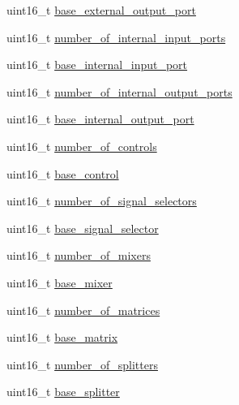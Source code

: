 \begin{DoxyCompactItemize}
uint16\+\_\+t \hyperlink{structjdksavdecc__descriptor__sensor__unit_a3103a3898813f4104c1d1d7f984e8229}{base\+\_\+external\+\_\+output\+\_\+port}
\item 
uint16\+\_\+t \hyperlink{structjdksavdecc__descriptor__sensor__unit_af14e1056175671f086901f07420bf46f}{number\+\_\+of\+\_\+internal\+\_\+input\+\_\+ports}
\item 
uint16\+\_\+t \hyperlink{structjdksavdecc__descriptor__sensor__unit_a11d926248b31db1ff60e6416c9c3d996}{base\+\_\+internal\+\_\+input\+\_\+port}
\item 
uint16\+\_\+t \hyperlink{structjdksavdecc__descriptor__sensor__unit_aeba303ee329974d2a1c3ff9b5b41ed4b}{number\+\_\+of\+\_\+internal\+\_\+output\+\_\+ports}
\item 
uint16\+\_\+t \hyperlink{structjdksavdecc__descriptor__sensor__unit_a238f1b0f1c8556b5e9586d93541169a5}{base\+\_\+internal\+\_\+output\+\_\+port}
\item 
uint16\+\_\+t \hyperlink{structjdksavdecc__descriptor__sensor__unit_a0104bea638bdadf1a547c2b93813e22f}{number\+\_\+of\+\_\+controls}
\item 
uint16\+\_\+t \hyperlink{structjdksavdecc__descriptor__sensor__unit_af06eac7dd98377a85258308e8a25e7f2}{base\+\_\+control}
\item 
uint16\+\_\+t \hyperlink{structjdksavdecc__descriptor__sensor__unit_af062758f302e01b8b7b7bd84cdb15806}{number\+\_\+of\+\_\+signal\+\_\+selectors}
\item 
uint16\+\_\+t \hyperlink{structjdksavdecc__descriptor__sensor__unit_a5bd998af8a76ae1336006ec16829b64d}{base\+\_\+signal\+\_\+selector}
\item 
uint16\+\_\+t \hyperlink{structjdksavdecc__descriptor__sensor__unit_a6d06803f27b9635d1fb276aa4d4a070b}{number\+\_\+of\+\_\+mixers}
\item 
uint16\+\_\+t \hyperlink{structjdksavdecc__descriptor__sensor__unit_ad2cbeba461f7e25ffee9118ab1343ee0}{base\+\_\+mixer}
\item 
uint16\+\_\+t \hyperlink{structjdksavdecc__descriptor__sensor__unit_a0c19f1b0409a0cdaaf557f4a7a717260}{number\+\_\+of\+\_\+matrices}
\item 
uint16\+\_\+t \hyperlink{structjdksavdecc__descriptor__sensor__unit_a4faf17fd3b3d91f6b24fe8d66a042309}{base\+\_\+matrix}
\item 
uint16\+\_\+t \hyperlink{structjdksavdecc__descriptor__sensor__unit_a3b40548ad0ea8b330660dcee0de42db7}{number\+\_\+of\+\_\+splitters}
\item 
uint16\+\_\+t \hyperlink{structjdksavdecc__descriptor__sensor__unit_a7a10a93a209406b90273d791f69a4421}{base\+\_\+splitter}

\end{DoxyCompactItemize}
